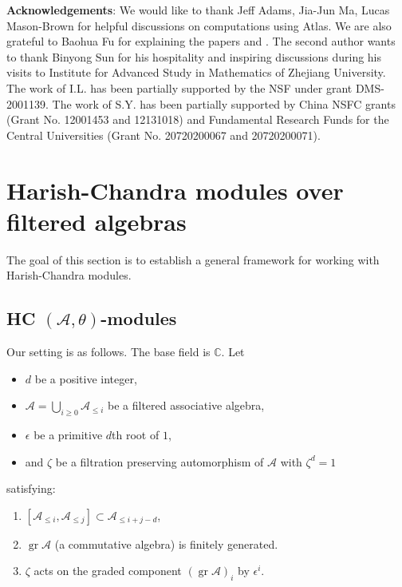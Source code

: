 \documentclass[12pt]{amsart}
\newcommand{\C}{\mathbb{C}}
\newcommand{\A}{\mathcal{A}}
\newcommand{\gr}{\operatorname{gr}}
\theoremstyle{definition}
\numberwithin{equation}{section}
\begin{document}
{\bf Acknowledgements}: We would like to thank Jeff Adams, Jia-Jun Ma, Lucas Mason-Brown for helpful discussions on computations using Atlas. We are also grateful to Baohua Fu for explaining the papers \cite{FJLS1} and \cite{FJLS2}. The second author wants to thank Binyong Sun for his hospitality and inspiring discussions during his visits to Institute for Advanced Study in Mathematics of Zhejiang University. The work of I.L. has been partially supported by the NSF under grant DMS-2001139. The work of S.Y. has been partially supported by China NSFC grants (Grant No. 12001453 and 12131018) and Fundamental Research Funds for the Central Universities (Grant No. 20720200067 and 20720200071).



\section{Harish-Chandra modules over filtered algebras}
The goal of this section is to establish a general framework for working with Harish-Chandra modules.
\subsection{HC $(\A,\theta)$-modules}\label{SS_HC_mod}
Our setting is as follows. The base field is $\C$. Let
\begin{itemize}
\item $d$ be a positive integer,
\item $\A=\bigcup_{i\geqslant 0}\A_{\leqslant i}$ be a filtered associative
algebra,
\item $\epsilon$ be a primitive $d$th root of $1$,
\item and $\zeta$ be a filtration preserving automorphism of $\A$ with $\zeta^d=1$
\end{itemize}
satisfying:
\begin{enumerate}
\item $[\A_{\leqslant i},\A_{\leqslant j}]\subset \A_{\leqslant i+j-d}$,
\item $\gr\A$ (a commutative algebra) is  finitely generated.
\item $\zeta$ acts on the graded component $(\gr\A)_i$ by $\epsilon^i$.
\end{enumerate}
\end{document}
